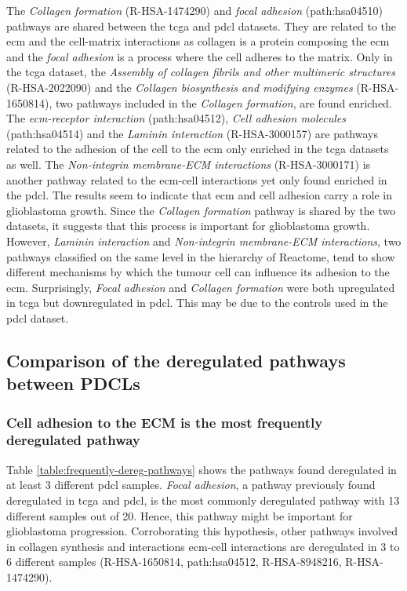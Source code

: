 The \textit{Collagen formation} (R-HSA-1474290) and \textit{focal adhesion} (path:hsa04510) pathways are shared between the \acrshort{tcga} and \acrshort{pdcl} datasets.
They are related to the \acrlong{ecm} and the cell-matrix interactions as collagen is a protein composing the \acrshort{ecm} and the \textit{focal adhesion} is a process where the cell adheres to the matrix.
Only in the \acrshort{tcga} dataset, the \textit{Assembly of collagen fibrils and other multimeric structures} (R-HSA-2022090) and the \textit{Collagen biosynthesis and modifying enzymes} (R-HSA-1650814), two pathways included in the \textit{Collagen formation}, are found enriched.
The \textit{\acrshort{ecm}-receptor interaction} (path:hsa04512), \textit{Cell adhesion molecules} (path:hsa04514) and the \textit{Laminin interaction} (R-HSA-3000157) are pathways related to the adhesion of the cell to the \acrshort{ecm} only enriched in the \acrshort{tcga} datasets as well.
The \textit{Non-integrin membrane-ECM interactions} (R-HSA-3000171) is another pathway related to the \acrshort{ecm}-cell interactions yet only found enriched in the \acrshort{pdcl}.
The results seem to indicate that \acrshort{ecm} and cell adhesion carry a role in glioblastoma growth.
Since the \textit{Collagen formation} pathway is shared by the two datasets, it suggests that this process is important for glioblastoma growth.
However, \textit{Laminin interaction} and \textit{Non-integrin membrane-ECM interactions}, two pathways classified on the same level in the hierarchy of Reactome, tend to show different mechanisms by which the tumour cell can influence its adhesion to the \acrshort{ecm}.
Surprisingly, \textit{Focal adhesion} and \textit{Collagen formation} were both upregulated in \acrshort{tcga} but downregulated in \acrshort{pdcl}.
This may be due to the controls used in the \acrshort{pdcl} dataset.

\subsection{Comparison of the deregulated pathways between PDCLs}

\subsubsection{Cell adhesion to the ECM is the most frequently deregulated pathway}

Table \ref*{table:frequently-dereg-pathways} shows the pathways found deregulated in at least 3 different \acrshort{pdcl} samples.
\textit{Focal adhesion}, a pathway previously found deregulated in \acrshort{tcga} and \acrshort{pdcl}, is the most commonly deregulated pathway with 13 different samples out of 20.
Hence, this pathway might be important for glioblastoma progression.
Corroborating this hypothesis, other pathways involved in collagen synthesis and interactions \acrshort{ecm}-cell interactions are deregulated in 3 to 6 different samples (R-HSA-1650814, path:hsa04512, R-HSA-8948216, R-HSA-1474290).

